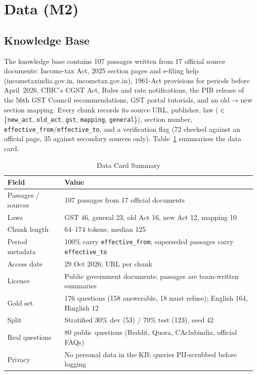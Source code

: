 \documentclass[conference]{IEEEtran}
\begin{document}
\section{Data (M2)}

\subsection{Knowledge Base}
The knowledge base contains 107 passages written from 17 official source documents: Income-tax Act, 2025
section pages and e-filing help (incometaxindia.gov.in, incometax.gov.in), 1961-Act provisions for periods
before April~2026, CBIC's CGST Act, Rules and rate notifications, the PIB release of the 56th GST Council
recommendations, GST portal tutorials, and an old$\to$new section mapping. Every chunk records its source
URL, publisher, law ($\in$ \{\texttt{new\_act}, \texttt{old\_act}, \texttt{gst}, \texttt{mapping},
\texttt{general}\}), section number, \texttt{effective\_from}/\texttt{effective\_to}, and a verification flag
(72 checked against an official page, 35 against secondary sources only). Table~\ref{tab:datacard}
summarises the data card.

\begin{table}[t]
\caption{Data Card Summary}
\label{tab:datacard}
\centering
\footnotesize
\begin{tabular}{@{}p{}p{}@{}}
\toprule
Field & Value \\
\midrule
Passages / sources & 107 passages from 17 official documents \\
Laws & GST 46, general 23, old Act 16, new Act 12, mapping 10 \\
Chunk length & 64--174 tokens, median 125 \\
Period metadata & 100\% carry \texttt{effective\_from}; superseded passages carry \texttt{effective\_to} \\
Access date & 29 Oct 2026; URL per chunk \\
Licence & Public government documents; passages are team-written summaries \\
Gold set & 176 questions (158 answerable, 18 must refuse); English 164, Hinglish 12 \\
Split & Stratified 30\% dev (53) / 70\% test (123), seed 42 \\
Real questions & 80 public questions (Reddit, Quora, CAclubindia, official FAQs) \\
Privacy & No personal data in the KB; queries PII-scrubbed before logging \\
\bottomrule
\end{tabular}
\end{table}
\end{document}
